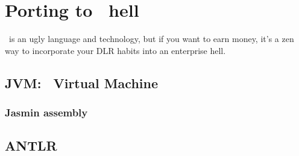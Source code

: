 \part{Porting to \J\ hell}

\J\ is an ugly language and technology, but if you want to earn money, it's a
zen way to incorporate your DLR habits into an enterprise hell.

\chapter{JVM: \J\ Virtual Machine}

\section{Jasmin assembly}

\chapter{ANTLR}

